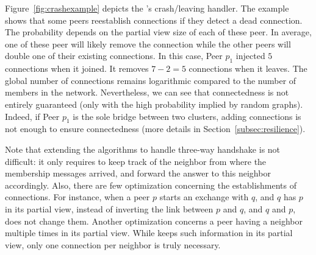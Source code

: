 \begin{figure*}
  \centering
  \hspace{10pt}
  \hspace{10pt}
  \caption{\label{fig:crashexample}Example of \SCAMPLON{}'s crash/leaving
    handler. The scenario follows from prior examples after few other
    exchanges. Peer $p_1$ leaves the network without giving notice. With it,
    $7$ connections are down. Peers $p_3$, $p_4$, and $p_5$ have the
    crashed/left peer in their partial view. Peer $p_5$ has
    $1-{1\over{|\mathcal{P}_5|}}={2\over{3}}$ chance to replace the dead
    connections. In this case, it doubles the connection to
    $p_{13}$. Identically, $p_3$ and $p_4$ detect the crash/leaving and run the
    appropriate procedure. Only $p_3$ doubles one of its connection. In total,
    $5$ connections have been removed.}
\end{figure*}

Figure~\ref{fig:crashexample} depicts the \SCAMPLON{}'s crash/leaving
handler. The example shows that some peers reestablish connections if they
detect a dead connection. The probability depends on the partial view size of
each of these peer. In average, one of these peer will likely remove the
connection while the other peers will double one of their existing
connections. In this case, Peer $p_1$ injected $5$ connections when it
joined. It removes $7-2 =5 $ connections when it leaves. The global number of
connections remains logarithmic compared to the number of members in the
network. Nevertheless, we can see that connectedness is not entirely guaranteed
(only with the high probability implied by random graphs). Indeed, if Peer
$p_1$ is the sole bridge between two clusters, adding connections is not enough
to ensure connectedness (more details in Section~\ref{subsec:resilience}).

Note that extending the algorithms to handle three-way handshake is not
difficult: it only requires to keep track of the neighbor from where the
membership messages arrived, and forward the answer to this neighbor
accordingly. Also, there are few optimization concerning the establishments of
connections. For instance, when a peer $p$ starts an exchange with $q$, and $q$
has $p$ in its partial view, instead of inverting the link between $p$ and $q$,
and $q$ and $p$, \SCAMPLON{} does not change them. Another optimization
concerns a peer having a neighbor multiple times in its partial view. While
\SCAMPLON{} keeps such information in its partial view, only one connection per
neighbor is truly necessary.

